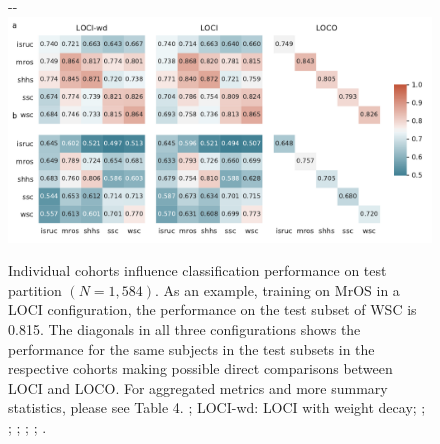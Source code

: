 \begin{figure}[tb]
    \begin{adjustwidth*}{}{-\marginparwidth-\marginparsep}
    \includegraphics[width=\linewidth]{figures/paper-ii/figure_03_a-b.pdf}
    \caption[\acs{MASSC}v2 \acs{LOCI} and \acs{LOCO} performance]{Individual cohorts influence classification performance on test partition \((N=1,584)\). As an example, training on \ac{MrOS} in a \ac{LOCI} configuration, the performance on the test subset of \ac{WSC} is 0.815. The diagonals in all three configurations shows the performance for the same subjects in the test subsets in the respective cohorts making possible direct comparisons between \ac{LOCI} and \ac{LOCO}. For aggregated metrics and more summary statistics, please see Table 4. %
    ; %
    \acs{LOCI}-wd: \acs{LOCI} with weight decay; %
    ; %
    ; %
    ; %
    ; %
    ; %
    .}
    \label{fig:sleep-stages:paper-ii:figure-03}
    \end{adjustwidth*}
\end{figure}
